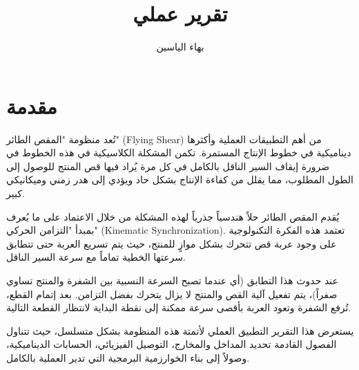 \documentclass[12pt,a4paper,fleqn]{report}
\begin{document}

\title{ تقرير عملي}
\author{بهاء الياسين}


\maketitle


\tableofcontents
\clearpage


\chapter{مقدمة}
\label{ch:flying_shear_intro}

تُعد منظومة "المقص الطائر" (\textenglish{Flying Shear}) من أهم التطبيقات العملية وأكثرها ديناميكية في خطوط الإنتاج المستمرة. تكمن المشكلة الكلاسيكية في هذه الخطوط في ضرورة إيقاف السير الناقل بالكامل في كل مرة يُراد فيها قص المنتج للوصول إلى الطول المطلوب، مما يقلل من كفاءة الإنتاج بشكل حاد ويؤدي إلى هدر زمني وميكانيكي كبير.

يُقدم المقص الطائر حلاً هندسياً جذرياً لهذه المشكلة من خلال الاعتماد على ما يُعرف بمبدأ "التزامن الحركي" (\textenglish{Kinematic Synchronization}). تعتمد هذه الفكرة التكنولوجية على وجود عربة قص تتحرك بشكل موازٍ للمنتج، حيث يتم تسريع العربة حتى تتطابق سرعتها الخطية تماماً مع سرعة السير الناقل. 

عند حدوث هذا التطابق (أي عندما تصبح السرعة النسبية بين الشفرة والمنتج تساوي صفراً)، يتم تفعيل آلية القص والمنتج لا يزال يتحرك بفضل التزامن. بعد إتمام القطع، تُرفع الشفرة وتعود العربة بأقصى سرعة ممكنة إلى نقطة البداية لانتظار القطعة التالية. 

يستعرض هذا التقرير التطبيق العملي لأتمتة هذه المنظومة بشكل متسلسل، حيث تتناول الفصول القادمة تحديد المداخل والمخارج، التوصيل الفيزيائي، الحسابات الديناميكية، وصولاً إلى بناء الخوارزمية البرمجية التي تدير العملية بالكامل.
\end{document}
